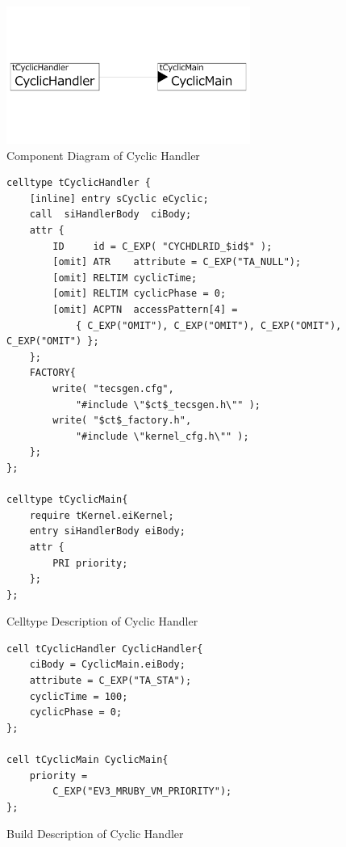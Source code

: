 \documentclass[conference,compsoc]{IEEEtran}
\begin{document}
\begin{figure}[t]
    \centering
    \includegraphics[width=8cm,clip]{figure/cyclic_handler.pdf}
    \caption{Component Diagram of Cyclic Handler}
    \label{fig:cyclic_handler}
\end{figure}
\begin{figure}[t]
    \centering
    \begin{lstlisting}
celltype tCyclicHandler {
    [inline] entry sCyclic eCyclic;
    call  siHandlerBody  ciBody; 
    attr {
    	ID     id = C_EXP( "CYCHDLRID_$id$" );
    	[omit] ATR    attribute = C_EXP("TA_NULL");
    	[omit] RELTIM cyclicTime;
    	[omit] RELTIM cyclicPhase = 0;
        [omit] ACPTN  accessPattern[4] = 
            { C_EXP("OMIT"), C_EXP("OMIT"), C_EXP("OMIT"), C_EXP("OMIT") };
    };
    FACTORY{
    	write( "tecsgen.cfg",
            "#include \"$ct$_tecsgen.h\"" );
    	write( "$ct$_factory.h",
            "#include \"kernel_cfg.h\"" );
    };
};

celltype tCyclicMain{
    require tKernel.eiKernel;
    entry siHandlerBody eiBody;
    attr {
        PRI priority;
    };
};
    \end{lstlisting}
    \caption{Celltype Description of Cyclic Handler}
    \label{celltype_cyclic_handler}
\end{figure}


\begin{figure}[t]
    \centering
    \begin{lstlisting}
cell tCyclicHandler CyclicHandler{
    ciBody = CyclicMain.eiBody;
    attribute = C_EXP("TA_STA");
    cyclicTime = 100;
    cyclicPhase = 0;
};

cell tCyclicMain CyclicMain{
    priority = 
        C_EXP("EV3_MRUBY_VM_PRIORITY");
};
   \end{lstlisting}
    \caption{Build Description of Cyclic Handler}
    \label{build_cyclic_handler}
\end{figure}
\end{document}
